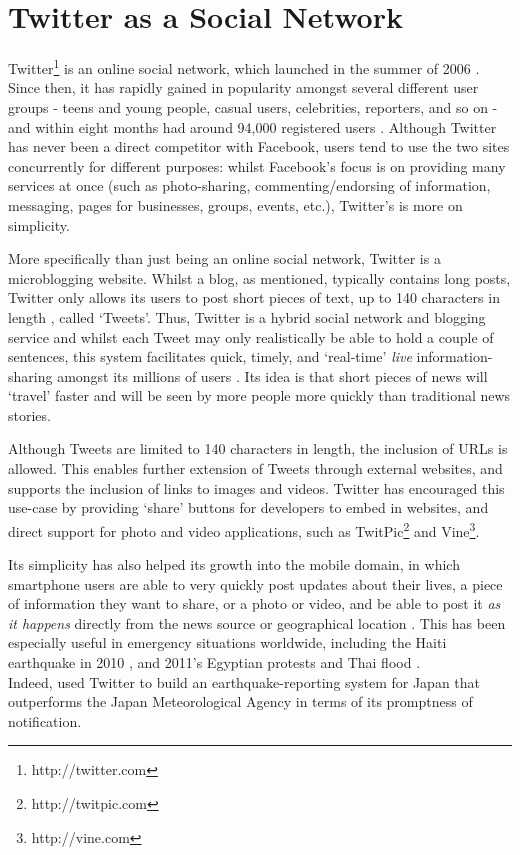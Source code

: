 \section{Twitter as a Social Network}
Twitter\footnote{http://twitter.com} is an online social network, which launched in the summer of 2006 \cite{krishnamurthy08}. Since then, it has rapidly gained in popularity amongst several different user groups - teens and young people, casual users, celebrities, reporters, and so on - and within eight months had around 94,000 registered users \cite{java07}. Although Twitter has never been a direct competitor with Facebook, users tend to use the two sites concurrently for different purposes: whilst Facebook's focus is on providing many services at once (such as photo-sharing, commenting/endorsing of information, messaging, pages for businesses, groups, events, etc.), Twitter's is more on simplicity.

More specifically than just being an online social network, Twitter is a microblogging website. Whilst a blog, as mentioned, typically contains long posts, Twitter only allows its users to post short pieces of text, up to 140 characters in length \cite{krishnamurthy08} \cite{huberman08}, called `Tweets'. Thus, Twitter is a hybrid social network and blogging service and whilst each Tweet may only realistically be able to hold a couple of sentences, this system facilitates quick, timely, and `real-time' \textit{live} information-sharing amongst its millions of users \cite{zhao09}. Its idea is that short pieces of news will `travel' faster and will be seen by more people more quickly than traditional news stories.

Although Tweets are limited to 140 characters in length, the inclusion of URLs is allowed. This enables further extension of Tweets through external websites, and supports the inclusion of links to images and videos. Twitter has encouraged this use-case by providing `share' buttons for developers to embed in websites, and direct support for photo and video applications, such as TwitPic\footnote{http://twitpic.com} and Vine\footnote{http://vine.com}.

Its simplicity has also helped its growth into the mobile domain, in which smartphone users are able to very quickly post updates about their lives, a piece of information they want to share, or a photo or video, and be able to post it \textit{as it happens} directly from the news source or geographical location \cite{castillo11}. This has been especially useful in emergency situations worldwide, including the Haiti earthquake in 2010 \cite{muralidharan11}, and 2011's Egyptian protests \cite{wilson11} and Thai flood \cite{kongthon12}.\\
Indeed, \cite{sakaki10} used Twitter to build an earthquake-reporting system for Japan that outperforms the Japan Meteorological Agency in terms of its promptness of notification.


